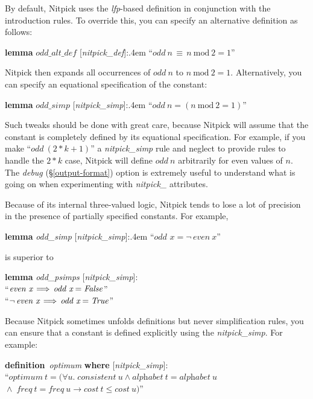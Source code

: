 \documentclass[a4paper,12pt]{article}
\begin{document}
By default, Nitpick uses the \textit{lfp}-based definition in conjunction with
the introduction rules. To override this, you can specify an alternative
definition as follows:

\prew
\textbf{lemma} $\mathit{odd\_alt\_def}$ [\textit{nitpick\_def}]:\kern.4em ``$\textit{odd}~n \,\equiv\, n~\textrm{mod}~2 = 1$''
\postw

Nitpick then expands all occurrences of $\mathit{odd}~n$ to $n~\textrm{mod}~2
= 1$. Alternatively, you can specify an equational specification of the constant:

\prew
\textbf{lemma} $\mathit{odd\_simp}$ [\textit{nitpick\_simp}]:\kern.4em ``$\textit{odd}~n = (n~\textrm{mod}~2 = 1)$''
\postw

Such tweaks should be done with great care, because Nitpick will assume that the
constant is completely defined by its equational specification. For example, if
you make ``$\textit{odd}~(2 * k + 1)$'' a \textit{nitpick\_simp} rule and neglect to provide rules to handle the $2 * k$ case, Nitpick will define
$\textit{odd}~n$ arbitrarily for even values of $n$. The \textit{debug}
(\S\ref{output-format}) option is extremely useful to understand what is going
on when experimenting with \textit{nitpick\_} attributes.

Because of its internal three-valued logic, Nitpick tends to lose a
lot of precision in the presence of partially specified constants. For example,

\prew
\textbf{lemma} \textit{odd\_simp} [\textit{nitpick\_simp}]:\kern.4em ``$\textit{odd~x} = \lnot\, \textit{even}~x$''
\postw

is superior to

\prew
\textbf{lemma} \textit{odd\_psimps} [\textit{nitpick\_simp}]: \\
``$\textit{even~x} \,\Longrightarrow\, \textit{odd~x} = \textit{False\/}$'' \\
``$\lnot\, \textit{even~x} \,\Longrightarrow\, \textit{odd~x} = \textit{True\/}$''
\postw

Because Nitpick sometimes unfolds definitions but never simplification rules,
you can ensure that a constant is defined explicitly using the
\textit{nitpick\_simp}. For example:

\prew
\textbf{definition}~\textit{optimum} \textbf{where} [\textit{nitpick\_simp}]: \\
``$\textit{optimum}~t =
     (\forall u.\; \textit{consistent}~u \mathrel{\land} \textit{alphabet}~t = \textit{alphabet}~u$ \\
${\mathrel{\land}}\; \textit{freq}~t = \textit{freq}~u \longrightarrow
         \textit{cost}~t \le \textit{cost}~u)$''
\postw
\end{document}
